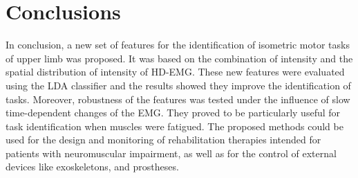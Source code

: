 


\section{Conclusions} \label{sc:3-5}
In conclusion, a new set of features for the identification of isometric motor tasks of upper limb was proposed. It was based on the combination of intensity and the spatial distribution of intensity of HD-EMG. These new features were evaluated using the LDA classifier and the results showed they improve the identification of tasks. Moreover, robustness of the features was tested under the influence of slow time-dependent changes of the EMG. They proved to be particularly useful for task identification when muscles were fatigued. The proposed methods could be used for the design and monitoring of rehabilitation therapies intended for patients with neuromuscular impairment, as well as for the control of external devices like exoskeletons, and prostheses.





